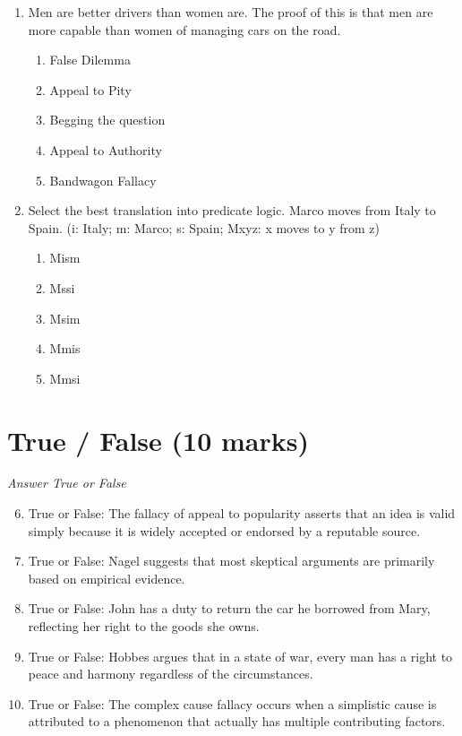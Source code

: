 \documentclass[12pt]{article}
\begin{document}
\begin{enumerate}[label=\arabic*.]
\begin{enumerate}[label=(\alph*)]
    \item disagreement in interest.
\end{enumerate}
\item Men are better drivers than women are. The proof of this is that men are more capable than
women of managing cars on the road.
\begin{enumerate}[label=(\alph*)]
    \item False Dilemma
    \item Appeal to Pity
    \item Begging the question
    \item Appeal to Authority
    \item Bandwagon Fallacy
\end{enumerate}
\item Select the best translation into predicate logic. Marco moves from Italy to Spain. (i:
Italy; m: Marco; s: Spain; Mxyz: x moves to y from z)
\begin{enumerate}[label=(\alph*)]
    \item Mism
    \item Mssi
    \item Msim
    \item Mmis
    \item Mmsi
\end{enumerate}
\end{enumerate}

\section*{True / False (10 marks)}
\textit{Answer True or False}
\begin{enumerate}[label=\arabic*.]
\setcounter{enumi}{5}
\item True or False: The fallacy of appeal to popularity asserts that an idea is valid simply because it is widely accepted or endorsed by a reputable source.
\item True or False: Nagel suggests that most skeptical arguments are primarily based on empirical evidence.
\item True or False: John has a duty to return the car he borrowed from Mary, reflecting her right to the goods she owns.
\item True or False: Hobbes argues that in a state of war, every man has a right to peace and harmony regardless of the circumstances.
\item True or False: The complex cause fallacy occurs when a simplistic cause is attributed to a phenomenon that actually has multiple contributing factors.
\end{enumerate}
\end{document}
